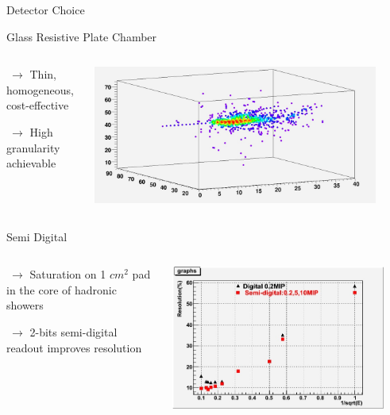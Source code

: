 \documentclass[10pt]{beamer}
\begin{document}
\begin{frame}{Detector Choice}

  \begin{block}{Glass Resistive Plate Chamber}
    \begin{columns}
      \begin{column}{0.5\textwidth}
        {
   	  \par $ ~ \rightarrow$ Thin, homogeneous, cost-effective
          \par $ ~ \rightarrow$ High granularity achievable
        }   
      \end{column}
      \begin{column}{0.5\textwidth}
        \centerline{\includegraphics[width=0.9\textwidth]{jpg/ShowerExample}}
      \end{column}
    \end{columns}
  \end{block}
  
  \pause   

  \begin{block}{  Semi Digital}
    \begin{columns}
      \begin{column}{0.5\textwidth}
        {
          \par $ ~ \rightarrow$ Saturation on 1 $cm^2$ pad in the core of hadronic showers 
          \par $ ~\rightarrow$ 2-bits semi-digital readout improves resolution
        }
      \end{column}

      \begin{column}{0.5\textwidth}
        \centerline{\includegraphics[width=0.9\textwidth]{jpg/DigitalSemiDigital}}
      \end{column}
    \end{columns}


\end{block}
\end{frame}
\end{document}
